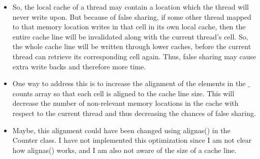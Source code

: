 \documentclass{article}
\begin{document}
\begin{enumerate}
\begin{itemize}
            \item So, the local cache of a thread may contain a location which the thread will never write upon. But because of false sharing, if some other thread mapped to that memory location writes in that cell in its own local cache, then the entire cache line will be invalidated along with the current thread's cell. So, the whole cache line will be written through lower caches, before the current thread can retrieve its corresponding cell again. Thus, false sharing may cause extra write backs and therefore more time.
    
            \item One way to address this is to increase the alignment of the elements in the $\_$counts array so that each cell is aligned to the cache line size. This will decrease the number of non-relevant memory locations in the cache with respect to the current thread and thus decreasing the chances of false sharing.
    
            \item Maybe, this alignment could have been changed using alignas() in the Counter class. I have not implemented this optimization since I am not clear how alignas() works, and I am also not aware of the size of a cache line.
        \end{itemize}
    \end{enumerate}
\end{document}

